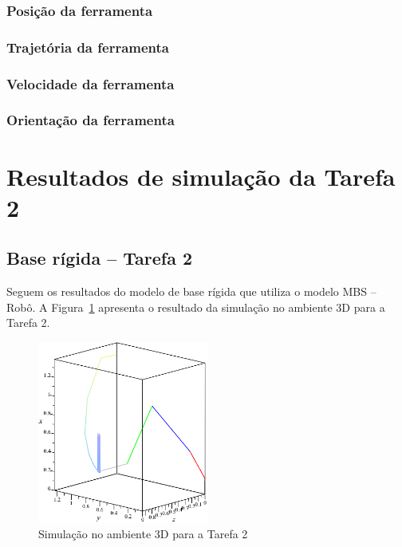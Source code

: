 \subsubsection{Posição da ferramenta}

\subsubsection{Trajetória da ferramenta}

\subsubsection{Velocidade da ferramenta}

\subsubsection{Orientação da ferramenta}


\newpage
\section{Resultados de simulação da Tarefa 2} \label{sec::resultados_t2}

\subsection{Base rígida -- Tarefa 2}

Seguem os resultados do modelo de base rígida que utiliza o modelo MBS --
Robô.
A Figura~\ref{fig::t2_anima3D_base_rig} apresenta o resultado da simulação no ambiente
3D para a Tarefa 2.

\begin{figure}[h!]
	\centering 
 	\includegraphics[width=0.50\textwidth]{figs/t2_anima3D_base_rig}
 	\caption{Simulação no ambiente 3D para a Tarefa 2}
 	\label{fig::t2_anima3D_base_rig}
\end{figure}


